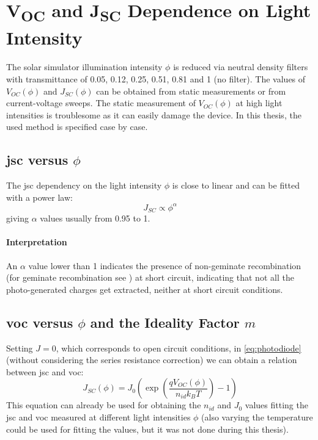 \section{V\textsubscript{OC} and J\textsubscript{SC} Dependence on Light Intensity}
	The solar simulator illumination intensity $\phi$ is reduced via neutral density filters with transmittance of 0.05, 0.12, 0.25, 0.51, 0.81 and 1 (no filter). The values of $V_{OC}(\phi)$ and $J_{SC}(\phi)$ can be obtained from static measurements or from current-voltage sweeps. The static measurement of $V_{OC}(\phi)$ at high light intensities is troublesome as it can easily damage the device. In this thesis, the used method is specified case by case. %

	\subsection{\Gls{jsc} versus $\phi$}
		The \gls{jsc} dependency on the light intensity $\phi$ is close to linear and can be fitted with a power law:
		\begin{equation} \label{eq:jsc-phi}
			J_{SC} \propto \phi^\alpha
		\end{equation}
		giving $\alpha$ values usually from 0.95 to 1.

		\paragraph{Interpretation} %
		An $\alpha$ value lower than 1 indicates the presence of non-geminate recombination (for geminate recombination see ) at short circuit\cite{Credgington2011}, indicating that not all the photo-generated charges get extracted, neither at short circuit conditions.

	\subsection{\Gls{voc} versus $\phi$ and the Ideality Factor $m$}
		Setting $J=0$, which corresponds to open circuit conditions, in \cref{eq:photodiode} (without considering the series resistance correction) we can obtain a relation between \gls{jsc} and \gls{voc}:
		$$J_{SC}(\phi) = J_0\left(\exp\left(\frac{qV_{OC}(\phi)}{n_{id}k_BT}\right)-1\right)$$
		This equation can already be used for obtaining the $n_{id}$ and $J_0$ values fitting the \gls{jsc} and \gls{voc} measured at different light intensities $\phi$ (also varying the temperature could be used for fitting the values, but it was not done during this thesis).

